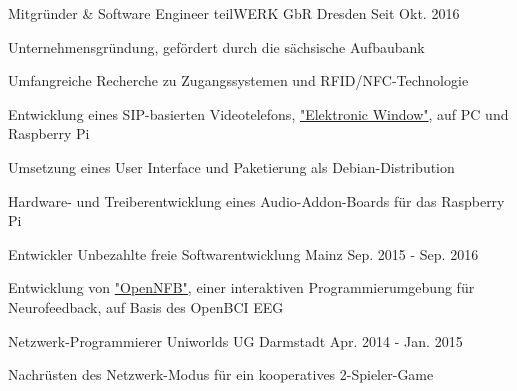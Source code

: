 
\begin{cventries}

  \cventry
    {Mitgründer \& Software Engineer} %
    {teilWERK GbR} %
    {Dresden} %
    {Seit Okt. 2016} %
    {
      \begin{cvitems} %
        \item {Unternehmensgründung, gefördert durch die sächsische Aufbaubank}
        \item {Umfangreiche Recherche zu Zugangssystemen und RFID/NFC-Technologie}
        \item {Entwicklung eines SIP-basierten Videotelefons, \href{https://ewindow.org}{"Elektronic Window"}, auf PC und Raspberry Pi}
        \item {Umsetzung eines User Interface und Paketierung als Debian-Distribution }
        \item {Hardware- und Treiberentwicklung eines Audio-Addon-Boards für das Raspberry Pi}
      \end{cvitems}
    }

  \cventry
    {Entwickler} %
    {Unbezahlte freie Softwarentwicklung} %
    {Mainz} %
    {Sep. 2015 - Sep. 2016} %
    {
      \begin{cvitems} %
        \item {Entwicklung von \href{https://github.com/strfry/OpenNFB}{"OpenNFB"}, einer interaktiven Programmierumgebung für Neurofeedback, auf Basis des OpenBCI EEG}
      \end{cvitems}
    }

  \cventry
    {Netzwerk-Programmierer} %
    {Uniworlds UG} %
    {Darmstadt} %
    {Apr. 2014 - Jan. 2015} %
    {
      \begin{cvitems} %
        \item {Nachrüsten des Netzwerk-Modus für ein kooperatives 2-Spieler-Game}
      \end{cvitems}
    }


\end{cventries}
